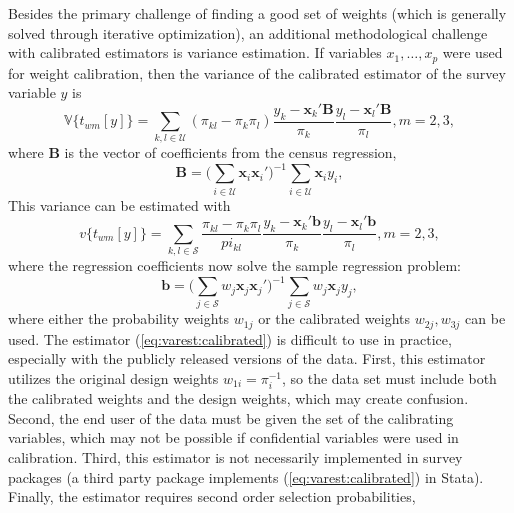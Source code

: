 Besides the primary challenge of finding a good set of weights
(which is generally solved through iterative optimization),
an additional methodological challenge with calibrated estimators
is variance estimation. If variables $x_1,\ldots,x_p$ were used
for weight calibration, then the variance of the calibrated
estimator of the survey variable $y$ is
\begin{equation}
    \mathbb{V}\bigl\{t_{wm}[y]\bigr\} = \sum_{k,l \in \mathcal{U}}
        (\pi_{kl}-\pi_k \pi_l)
        \frac{y_k - \mathbf{x}_k ' \mathbf{B}}{\pi_k}
        \frac{y_l - \mathbf{x}_l ' \mathbf{B}}{\pi_l}, m=2,3,
    \label{eq:var:calibrated}
\end{equation}
where $\mathbf{B}$ is the vector of coefficients from the
census regression,
\begin{equation}
    \mathbf{B}
    = \bigl( \sum_{i \in \mathcal{U}} \mathbf{x}_i \mathbf{x}_i' )^{-1}
      \sum_{i \in \mathcal{U}} \mathbf{x}_i y_i
    \label{eq:census:regression},
\end{equation}
This variance can be estimated with
\begin{equation}
    v\bigl\{t_{wm}[y]\bigr\} = \sum_{k,l \in \mathcal{S}}
        \frac{\pi_{kl}-\pi_k \pi_l}{pi_{kl}}
        \frac{y_k - \mathbf{x}_k ' \mathbf{b}}{\pi_k}
        \frac{y_l - \mathbf{x}_l ' \mathbf{b}}{\pi_l}, m=2,3,
    \label{eq:varest:calibrated}
\end{equation}
where the regression coefficients now solve the sample
regression problem:
\begin{equation}
    \mathbf{b}
    = \bigl( \sum_{j \in \mathcal{S}} w_j \mathbf{x}_j \mathbf{x}_j' )^{-1}
      \sum_{j \in \mathcal{S}} w_j \mathbf{x}_j y_j
    \label{eq:sample:regression},
\end{equation}
where either the probability weights $w_{1j}$ or the calibrated weights
$w_{2j}, w_{3j}$ can be used. The estimator (\ref{eq:varest:calibrated})
is difficult to use in practice, especially with the publicly released
versions of the data. First, this estimator utilizes the original design weights
$w_{1i}=\pi_i^{-1}$, so the data set must include both the calibrated weights
and the design weights, which may create confusion. Second, the end user
of the data must be given the set of the calibrating variables, which may
not be possible if confidential variables were used in calibration. Third,
this estimator is not necessarily implemented in survey packages
(a third party package  implements (\ref{eq:varest:calibrated})
in Stata). Finally, the estimator requires second order selection probabilities,
